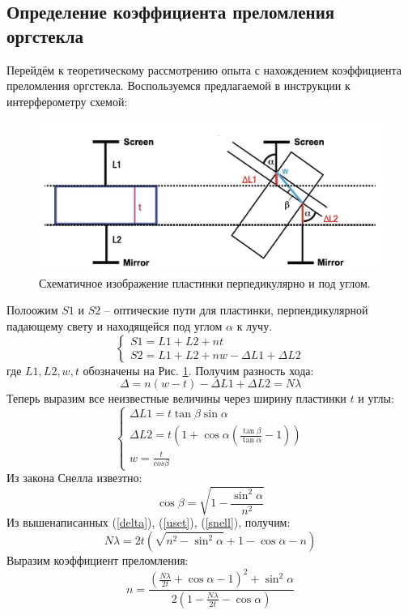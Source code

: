 \documentclass[a4paper, 12pt]{article}
\begin{document}
	\subsection*{Определение коэффициента преломления оргстекла}
	Перейдём к теоретическому рассмотрению опыта с нахождением коэффициента преломления оргстекла. Воспользуемся предлагаемой в инструкции к интерферометру схемой:
	\begin{figure}[H]
		\centering
		\includegraphics[width=0.85\linewidth]{sch1.png}
		\caption{Схематичное изображение пластинки перпедикулярно и под углом.}
		\label{fig:1}
	\end{figure}
	Полоожим $S1$ и $S2$ -- оптические пути для пластинки, перпендикулярной падающему свету и находящейся под углом $\alpha$ к лучу.
	\begin{equation}
		\begin{cases}
			S1= L1 + L2 + nt\\
			S2 = L1 + L2 + nw - \Delta L1 + \Delta L2
		\end{cases}
	\end{equation}
	где $L1, L2, w, t$ обозначены на Рис. \ref{fig:1}. Получим разность хода:
	\begin{equation}\label{delta}
		\Delta = n(w - t) - \Delta L1 + \Delta L2 = N \lambda
	\end{equation}
	Теперь выразим все неизвестные величины через ширину пластинки $t$ и углы:
	\begin{equation}\label{uset}
		\begin{cases}
			\Delta L1 = t \tan{\beta} \sin{\alpha}\\
			\Delta L2 = t (1 + \cos{\alpha}(\frac{\tan{\beta}}{\tan{\alpha}} - 1))\\
			w = \frac{t}{cos{\beta}}
		\end{cases}
	\end{equation}
	Из закона Снелла извезтно:
	\begin{equation}\label{snell}
		\cos{\beta} = \sqrt{1 - \frac{\sin^2{\alpha}}{n^2}}
	\end{equation}
	Из вышенаписанных (\ref{delta}), (\ref{uset}), (\ref{snell}), получим:
	\begin{equation}
		N \lambda = 2 t (\sqrt{n^2 - \sin^2{\alpha}} + 1 - \cos{\alpha} - n)
	\end{equation}
	Выразим коэффициент преломления:
	\begin{equation}\label{pn}
		n = \frac{(\frac{N \lambda}{2t} + \cos{\alpha} - 1)^2 + \sin^2{\alpha}}{2 (1 -\frac{N \lambda}{2t} - \cos{\alpha})}
	\end{equation}
\end{document}
